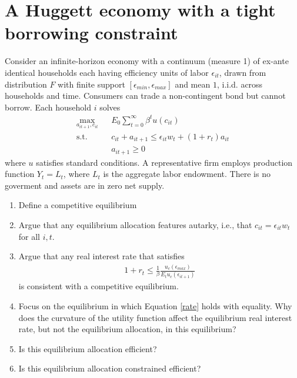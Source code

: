 \documentclass{article}[11pt]
\newcommand{\lb}{\label}
\newcommand{\ben}{\begin{enumerate}}
\newcommand{\een}{\end{enumerate}}
\begin{document}
\section*{A Huggett economy with a tight borrowing constraint}
Consider an infinite-horizon economy with a continuum (measure 1) of ex-ante identical households each having efficiency units of labor $\epsilon_{it}$, drawn from distribution $F$ with finite support $[\epsilon_{min}, \epsilon_{max}]$ and mean $1$, i.i.d. across households and time. Consumers can trade a non-contingent bond but cannot borrow. Each household $i$ solves
\begin{eqnarray}
\max_{a_{it+1}, c_{it}} && E_0 \sum_{t=0}^{\infty} \beta^t u(c_{it}) \nonumber \\
\text{s.t.} && c_{it} + a_{it+1} \leq \epsilon_{it} w_t + (1+r_t) a_{it} \nonumber \\
&& a_{it+1} \geq 0 \nonumber
\end{eqnarray}
where $u$ satisfies standard conditions. A representative firm employs production function $Y_t=L_t$, where $L_t$ is the aggregate labor endowment. There is no goverment and assets are in zero net supply. 
\ben
	\item Define a competitive equilibrium
	
	\item Argue that any equilibrium allocation features autarky, i.e., that $c_{it} = \epsilon_{it} w_t$ for all $i,t$.
	
	\item Argue that any real interest rate that satisfies
	\begin{eqnarray}
	\lb{rate}
	1+r_t \leq \frac{1}{\beta} \frac{u_c(\epsilon_{max})}{E_t u_c(\epsilon_{it+1})}
	\end{eqnarray}	 
	is consistent with a competitive equilibrium.
	
	\item Focus on the equilibrium in which Equation \eqref{rate} holds with equality. Why does the curvature of the utility function affect the equilibrium real interest rate, but not the equilibrium allocation, in this equilibrium?
	
	\item Is this equilibrium allocation efficient?
	
	\item Is this equilibrium allocation constrained efficient?	 
\een
\end{document}
